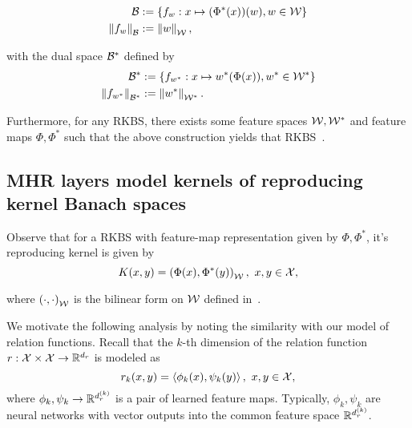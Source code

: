 \begin{align}
    {\mathcal{B}} &:= \left\{f_w: x \mapsto (\Phi^*(x))(w), w \in {\mathcal{W}}\right\} \\
    \left\lVert f_w\right\rVert_{\mathcal{B}} &:= \left\lVert w\right\rVert_{\mathcal{W}},
\end{align}

\noindent with the dual space ${\mathcal{B}}^*$ defined by
\begin{align}
    {\mathcal{B}}^* &:= \left\{f_{w^*}: x \mapsto w^*(\Phi(x)), w^* \in {\mathcal{W}}^*\right\} \\
    \left\lVert f_{w^*}\right\rVert_{{\mathcal{B}}^*} &:= \left\lVert w^*\right\rVert_{{\mathcal{W}}^*}.
\end{align}

Furthermore, for any RKBS, there exists some feature spaces ${\mathcal{W}}, {\mathcal{W}}^*$ and feature maps $\Phi, \Phi^*$ such that the above construction yields that RKBS~\parencite[Theorem 4]{zhangReproducingKernel2009}.

\subsection{MHR layers model kernels of reproducing kernel Banach spaces}

Observe that for a RKBS with feature-map representation given by $\Phi, \Phi^*$, it's reproducing kernel is given by
\begin{equation}
    K(x, y) = \left(\Phi(x), \Phi^*(y)\right)_{{\mathcal{W}}}, \ x, y \in {\mathcal{X}},
\end{equation}

\noindent where $\left(\cdot, \cdot\right)_{{\mathcal{W}}}$ is the bilinear form on ${\mathcal{W}}$ defined in~.

We motivate the following analysis by noting the similarity with our model of relation functions. Recall that the $k$-th dimension of the relation function $r: {\mathcal{X}} \times {\mathcal{X}} \to \mathbb{R}^{d_r}$ is modeled as
\begin{equation}
    r_k(x, y) = \left \langle \phi_k(x), \psi_k(y) \right\rangle, \ x, y \in {\mathcal{X}},
\end{equation}
\noindent where $\phi_k, \psi_k \to \mathbb{R}^{d_r^{(k)}}$ is a pair of learned feature maps. Typically, $\phi_k, \psi_k$ are neural networks with vector outputs into the common feature space $\mathbb{R}^{d_r^{(k)}}$.


